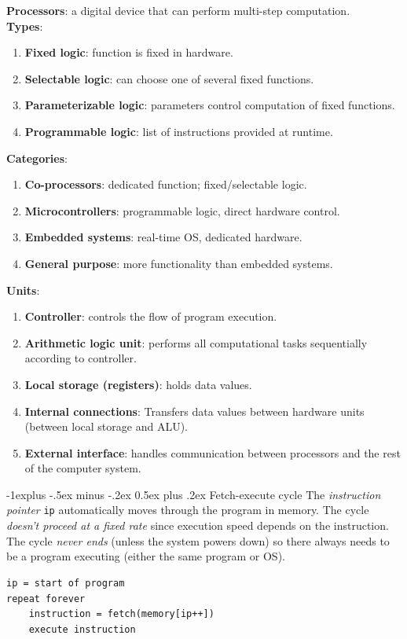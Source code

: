 \documentclass[10pt,landscape]{article}
\makeatletter
\renewcommand{\subsection}{\@startsection{subsection}{2}{0mm}%
                                {-1explus -.5ex minus -.2ex}%
                                {0.5ex plus .2ex}%
                                {\normalfont\normalsize\bfseries}}
\makeatother
\begin{document}
\begin{multicols}{3}
\textbf{Processors}: a digital device that can perform multi-step computation.\\
\textbf{Types}:
\begin{enumerate}
\item \textbf{Fixed logic}: function is fixed in hardware.
\item \textbf{Selectable logic}: can choose one of several fixed functions.
\item \textbf{Parameterizable logic}: parameters control computation of fixed functions.
\item \textbf{Programmable logic}: list of instructions provided at runtime.
\end{enumerate}
\textbf{Categories}:
\begin{enumerate}
\item\textbf{Co-processors}: dedicated function; fixed/selectable logic.
\item\textbf{Microcontrollers}: programmable logic, direct hardware control.
\item\textbf{Embedded systems}: real-time OS, dedicated hardware.
\item\textbf{General purpose}: more functionality than embedded systems.
\end{enumerate}
\textbf{Units}:
\begin{enumerate}
\item\textbf{Controller}: controls the flow of program execution.
\item\textbf{Arithmetic logic unit}: performs all computational tasks sequentially according to controller.
\item\textbf{Local storage (registers)}: holds data values.
\item\textbf{Internal connections}: Transfers data values between hardware units (between local storage and ALU).
\item\textbf{External interface}: handles communication between processors and the rest of the computer system.
\end{enumerate}
\subsection{Fetch-execute cycle}
The \textit{instruction pointer} \texttt{ip} automatically moves through the program in memory. The cycle \textit{doesn't proceed at a fixed rate} since execution speed depends on the instruction. The cycle \textit{never ends} (unless the system powers down) so there always needs to be a program executing (either the same program or OS).
\begin{verbatim}
ip = start of program
repeat forever
    instruction = fetch(memory[ip++])
    execute instruction
\end{verbatim}

\end{multicols}
\end{document}
